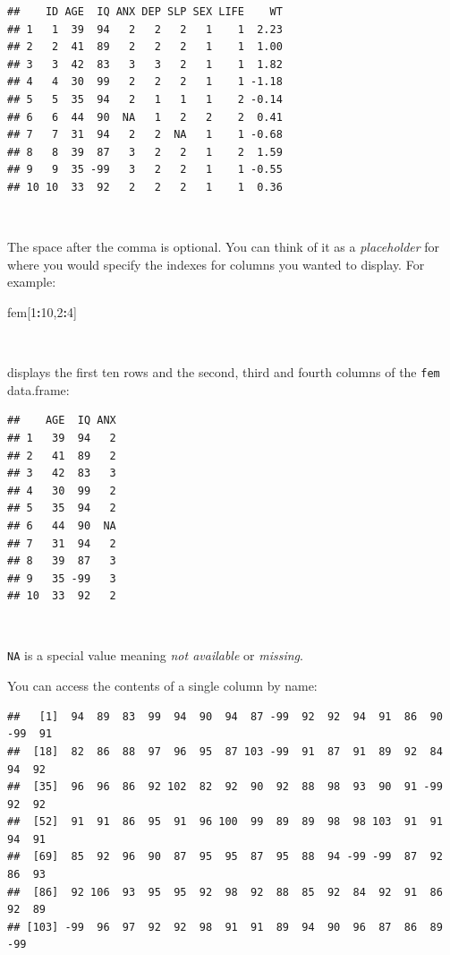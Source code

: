 \documentclass[12pt,a4paper]{book}
\newenvironment{Shaded}{\begin{snugshade}}{\end{snugshade}}
\newcommand{\DecValTok}[1]{\textcolor[rgb]{0.00,0.00,0.81}{#1}}
\newcommand{\OperatorTok}[1]{\textcolor[rgb]{0.81,0.36,0.00}{\textbf{#1}}}
\newcommand{\NormalTok}[1]{#1}
\theoremstyle{definition}
\theoremstyle{definition}
\theoremstyle{definition}
\theoremstyle{remark}
\begin{document}
\begin{verbatim}
##    ID AGE  IQ ANX DEP SLP SEX LIFE    WT
## 1   1  39  94   2   2   2   1    1  2.23
## 2   2  41  89   2   2   2   1    1  1.00
## 3   3  42  83   3   3   2   1    1  1.82
## 4   4  30  99   2   2   2   1    1 -1.18
## 5   5  35  94   2   1   1   1    2 -0.14
## 6   6  44  90  NA   1   2   2    2  0.41
## 7   7  31  94   2   2  NA   1    1 -0.68
## 8   8  39  87   3   2   2   1    2  1.59
## 9   9  35 -99   3   2   2   1    1 -0.55
## 10 10  33  92   2   2   2   1    1  0.36
\end{verbatim}

~

The space after the comma is optional. You can think of it as a
\emph{placeholder} for where you would specify the indexes for columns
you wanted to display. For example:

\begin{Shaded}
\begin{Highlighting}[]
\NormalTok{fem[}\DecValTok{1}\OperatorTok{:}\DecValTok{10}\NormalTok{,}\DecValTok{2}\OperatorTok{:}\DecValTok{4}\NormalTok{]}
\end{Highlighting}
\end{Shaded}

~

displays the first ten rows and the second, third and fourth columns of
the \texttt{fem} data.frame:

\begin{verbatim}
##    AGE  IQ ANX
## 1   39  94   2
## 2   41  89   2
## 3   42  83   3
## 4   30  99   2
## 5   35  94   2
## 6   44  90  NA
## 7   31  94   2
## 8   39  87   3
## 9   35 -99   3
## 10  33  92   2
\end{verbatim}

~

\texttt{NA} is a special value meaning \emph{not available} or
\emph{missing}.

You can access the contents of a single column by name:

\begin{Shaded}
\end{Shaded}

\begin{verbatim}
##   [1]  94  89  83  99  94  90  94  87 -99  92  92  94  91  86  90 -99  91
##  [18]  82  86  88  97  96  95  87 103 -99  91  87  91  89  92  84  94  92
##  [35]  96  96  86  92 102  82  92  90  92  88  98  93  90  91 -99  92  92
##  [52]  91  91  86  95  91  96 100  99  89  89  98  98 103  91  91  94  91
##  [69]  85  92  96  90  87  95  95  87  95  88  94 -99 -99  87  92  86  93
##  [86]  92 106  93  95  95  92  98  92  88  85  92  84  92  91  86  92  89
## [103] -99  96  97  92  92  98  91  91  89  94  90  96  87  86  89 -99
\end{verbatim}
\end{document}
